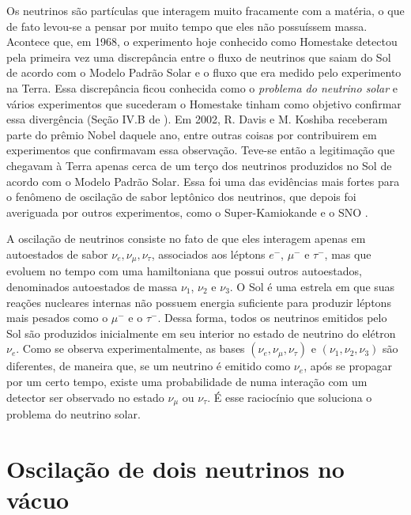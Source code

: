 \documentclass[12pt]{report}
\begin{document}
Os neutrinos são partículas que interagem muito fracamente com a matéria, o que de fato levou-se a pensar por muito tempo que eles não possuíssem massa. Acontece que, em 1968, o experimento hoje conhecido como Homestake \cite{homestake} detectou pela primeira vez uma discrepância entre o fluxo de neutrinos que saiam do Sol de acordo com o Modelo Padrão Solar \cite{solarmodel} e o fluxo que era medido pelo experimento na Terra. Essa discrepância ficou conhecida como o \textit{problema do neutrino solar} e vários experimentos que sucederam o Homestake tinham como objetivo confirmar essa divergência (Seção IV.B de \cite{gonzalez}). Em 2002, R. Davis e M. Koshiba receberam parte do prêmio Nobel daquele ano, entre outras coisas por contribuirem em experimentos que confirmavam essa observação. Teve-se então a legitimação que chegavam à Terra apenas cerca de um terço dos neutrinos produzidos no Sol de acordo com o Modelo Padrão Solar. Essa foi uma das evidências mais fortes para o fenômeno de oscilação de sabor leptônico dos neutrinos, que depois foi averiguada por outros experimentos, como o Super-Kamiokande \cite{superkamiokande} e o SNO \cite{sno}.

A oscilação de neutrinos consiste no fato de que eles interagem apenas em autoestados de sabor $\nu_e, \nu_\mu, \nu_\tau$, associados aos léptons $e^-$, $\mu^-$ e $\tau^-$, mas que evoluem no tempo com uma hamiltoniana que possui outros autoestados, denominados autoestados de massa $\nu_1$, $\nu_2$ e $\nu_3$. O Sol é uma estrela em que suas reações nucleares internas não possuem energia suficiente para produzir léptons mais pesados como o $\mu^-$ e o $\tau^-$. Dessa forma, todos os neutrinos emitidos pelo Sol são produzidos inicialmente em seu interior no estado de neutrino do elétron $\nu_e$. Como se observa experimentalmente, as bases $(\nu_e, \nu_\mu, \nu_\tau)$ e $(\nu_1, \nu_2, \nu_3)$ são diferentes, de maneira que, se um neutrino é emitido como $\nu_e$, após se propagar por um certo tempo, existe uma probabilidade de numa interação com um detector ser observado no estado $\nu_\mu$ ou $\nu_\tau$. É esse raciocínio que soluciona o problema do neutrino solar.


\section{Oscilação de dois neutrinos no vácuo} \label{sec:2nu-vacuo}
\end{document}
